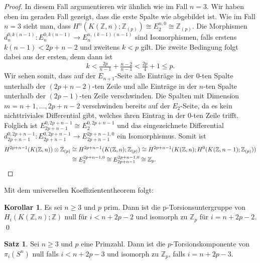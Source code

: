 \documentclass[11pt, a4paper, german]{article}
\theoremstyle{definition}
\newtheorem{satz}[lem]{Satz}
\newtheorem{kor}[lem]{Korollar}
\theoremstyle{remark}
\newcommand{\Z}{\mathbb{Z}} %
\begin{document}
\begin{proof}
  In diesem Fall argumentieren wir ähnlich wie im Fall $n = 3$.
  Wir haben eben im geraden Fall gezeigt, dass die erste Spalte wie abgebildet ist.
  Wie im Fall $n = 3$ sieht man, dass $H^n(K(\Z, n); \Z_{(p)}) \cong E_2^{n,0} \cong \Z_{(p)}$.
  Die Morphismen $d_n^{0,k (n-1)} : E_n^{0, k (n-1)} \to E_n^{n, (k-1) (n-1)}$ sind Isomorphismen, falls erstens $k (n-1) < 2p + n - 2$ und zweitens $k < p$ gilt.
  Die zweite Bedingung folgt dabei aus der ersten, denn dann ist
  \[ k < \tfrac{2p}{n-1} + \tfrac{n - 2}{n-1} < \tfrac{2p}{4} + 1 \leq p. \]
  Wir sehen somit, dass auf der $E_{n+1}$-Seite alle Einträge in der $0$-ten Spalte unterhalb der $(2p + n - 2)$-ten Zeile und alle Einträge in der $n$-ten Spalte unterhalb der $(2p - 1)$-ten Zeile verschwinden.
  Die Spalten mit Dimension $m = n+1, \ldots, 2p + n - 2$ verschwinden bereits auf der $E_2$-Seite, da es kein nichttriviales Differential gibt, welches ihren Eintrag in der $0$-ten Zeile trifft.
  Folglich ist $E_{2p + n - 1}^{0, 2p + n - 1} \cong E_{2}^{0, 2p + n - 1}$ und das eingezeichnete Differential $d_{2p + n - 1}^{0, 2p + n - 1} : E_{2p + n - 1}^{0, 2p + n - 1} \to E_{2p + n - 1}^{2p + n - 1, 0}$ ein Isomorphismus.
  Somit ist
  \begin{align*}
    H^{2p + n - 1}(K(\Z, n)) \otimes \Z_{(p)} & \cong H^{2p + n - 1}(K(\Z, n); \Z_{(p)}) \cong H^{2p + n - 1}(K(\Z, n); H^0(K(\Z, n-1); \Z_{(p)})) \\
    & \cong E_2^{2p + n - 1, 0} \cong E_{2p + n - 1}^{2p + n - 1, 0} \cong \Z_p. \qedhere
  \end{align*}
\end{proof}

Mit dem universellen Koeffiziententheorem folgt:

\begin{kor}\label{mod-p-homology-kzn}
  Es sei $n \geq 3$ und $p$ prim.
  Dann ist die p-Torsionsuntergruppe von $H_i(K(\Z, n); \Z)$ null für $i < n + 2p - 2$ und isomorph zu $\Z_p$ für $i = n + 2p - 2$. \qed
\end{kor}

\begin{satz}
  Sei $n \geq 3$ und $p$ eine Primzahl.
  Dann ist die $p$-Torsionskomponente von $\pi_i(S^n)$ null falls $i < n + 2p - 3$ und isomorph zu $\Z_p$, falls $i = n + 2p - 3$.
\end{satz}
\end{document}
